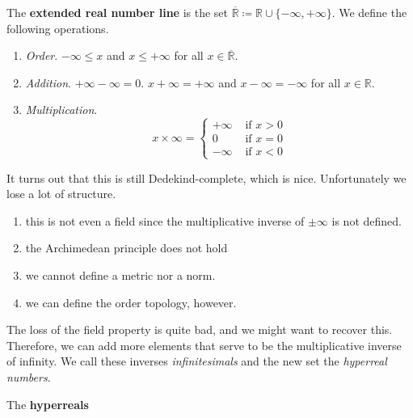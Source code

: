   \begin{theorem}
    The \textbf{extended real number line} is the set $\overline{\mathbb{R}} \coloneqq \mathbb{R} \cup \{-\infty, +\infty\}$. We define the following operations. 
    \begin{enumerate}
      \item \textit{Order}. $-\infty \leq x$ and $x \leq +\infty$ for all $x \in \overline{\mathbb{R}}$. 
      \item \textit{Addition}. $+\infty - \infty = 0$. $x + \infty = +\infty$ and $x - \infty = -\infty$ for all $x \in \mathbb{R}$. 
      \item \textit{Multiplication}. 
      \begin{equation}
        x \times \infty = \begin{cases} +\infty & \text{ if } x > 0 \\ 0 & \text{ if } x = 0 \\ -\infty & \text{ if } x < 0 \end{cases}
      \end{equation}
    \end{enumerate}
    It turns out that this is still Dedekind-complete, which is nice. Unfortunately we lose a lot of structure. 
    \begin{enumerate}
      \item this is not even a field since the multiplicative inverse of $\pm \infty$ is not defined. 
      \item the Archimedean principle does not hold 
      \item we cannot define a metric nor a norm. 
      \item we can define the order topology, however. 
    \end{enumerate}
  \end{theorem} 

  The loss of the field property is quite bad, and we might want to recover this. Therefore, we can add more elements that serve to be the multiplicative inverse of infinity. We call these inverses \textit{infinitesimals} and the new set the \textit{hyperreal numbers}. 

  \begin{theorem}[Hyperreals]
    The \textbf{hyperreals} 
  \end{theorem}

